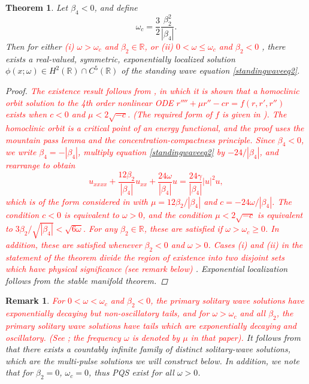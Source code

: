 \documentclass[12pt]{elsarticle}
\def\R{{\mathbb R}}
\newtheorem{theorem}{Theorem}
\newtheorem{remark}{Remark}
\newcommand{\revised}[1]{ \textcolor{red}{#1} }
\begin{document}
\begin{theorem}\label{theorem:solitonexist}
Let $\beta_4 < 0$, and define
\begin{equation}\label{omegac}
\omega_c = \frac{3}{2} \frac{\beta_2^2}{|\beta_4|}.
\end{equation}
Then for either \revised{ (i) $\omega > \omega_c$ and $\beta_2 \in \R$, or (ii) $0 < \omega \leq \omega_c$ and $\beta_2 < 0$ }, 
there exists a real-valued, symmetric, exponentially localized solution $\phi(x; \omega) \in H^2(\R) \cap C^5(\R)$ of the standing wave equation \cref{standingwaveeq2}. 
\begin{proof}
\revised{The existence result follows from \cite{Groves1998}, in which it is shown that a homoclinic orbit solution to the 4th order nonlinear ODE $r'''' + \mu r'' - cr = f(r, r', r'')$ exists when $c < 0$ and $\mu < 2 \sqrt{-c}$. (The required form of $f$ is given in \cite{Groves1998}). The homoclinic orbit is a critical point of an energy functional, and the proof uses the mountain pass lemma and the concentration-compactness principle. Since $\beta_4 < 0$, we write $\beta_4 = -|\beta_4|$, multiply equation \cref{standingwaveeq2} by $-24/|\beta_4|$, and rearrange to obtain
\begin{equation}\label{standingwaveeqGroves}
u_{xxxx} + \frac{12 \beta_2}{|\beta_4|}u_{xx} + \frac{24 \omega}{|\beta_4|}u = \frac{24 \gamma}{|\beta_4|} |u|^2 u,
\end{equation}
which is of the form considered in \cite{Groves1998} with $\mu = 12 \beta_2 / |\beta_4|$ and $c = -24 \omega/|\beta_4|$. The condition $c < 0$ is equivalent to $\omega > 0$, and the condition $\mu < 2 \sqrt{-c}$ is equivalent to $3 \beta_2/\sqrt{|\beta_4|} < \sqrt{6 \omega}$. For any $\beta_2 \in \R$, these are satisfied if $\omega > \omega_c \geq 0$. In addition, these are satisfied whenever $\beta_2 < 0$ and $\omega > 0$. Cases (i) and (ii) in the statement of the theorem divide the region of existence into two disjoint sets which have physical significance (see remark below)}. Exponential localization follows from the stable manifold theorem.
\end{proof}
\end{theorem}

\begin{remark}
\revised{For $0 < \omega < \omega_c$ and $\beta_2 < 0$, the primary solitary wave solutions have exponentially decaying but non-oscillatory tails, and for $\omega > \omega_c$ and all $\beta_2$, the primary solitary wave solutions have tails which are exponentially decaying and oscillatory. (See \cite[Figure 2(a)]{Tam2020}; the frequency $\omega$ is denoted by $\mu$ in that paper).} It follows from \cite{Groves1998} that there exists a countably infinite family of distinct solitary-wave solutions, which are the multi-pulse solutions we will construct below. In addition, we note that for $\beta_2 = 0$, $\omega_c = 0$, thus PQS exist for all $\omega > 0$.
\end{remark}
\end{document}
